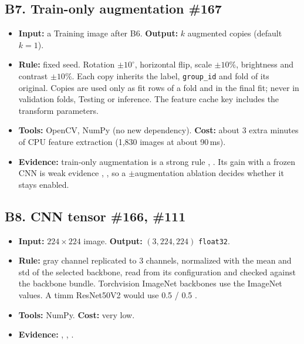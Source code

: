 \documentclass[11pt,a4paper]{article}
\newcommand{\board}[1]{\textsf{\##1}}
\begin{document}
\subsection*{B7. Train-only augmentation \hfill \board{167}}
\begin{itemize}
  \item \textbf{Input:} a Training image after B6. \textbf{Output:} $k$ augmented copies (default $k=1$).
  \item \textbf{Rule:} fixed seed. Rotation $\pm10^\circ$, horizontal flip, scale $\pm10\%$, brightness and contrast $\pm10\%$. Each copy inherits the label, \texttt{group\_id} and fold of its original. Copies are used only as fit rows of a fold and in the final fit; never in validation folds, Testing or inference. The feature cache key includes the transform parameters.
  \item \textbf{Tools:} OpenCV, NumPy (no new dependency). \textbf{Cost:} about 3 extra minutes of CPU feature extraction (1,830 images at about 90\,ms).
  \item \textbf{Evidence:} train-only augmentation is a strong rule \cite{r4}, \cite{r2}. Its gain with a frozen CNN is weak evidence \cite{r9}, \cite{r5}, so a $\pm$augmentation ablation decides whether it stays enabled.
\end{itemize}

\subsection*{B8. CNN tensor \hfill \board{166}, \board{111}}
\begin{itemize}
  \item \textbf{Input:} $224\times224$ image. \textbf{Output:} $(3, 224, 224)$ \texttt{float32}.
  \item \textbf{Rule:} gray channel replicated to 3 channels, normalized with the mean and std of the selected backbone, read from its configuration and checked against the backbone bundle. Torchvision ImageNet backbones use the ImageNet values. A timm ResNet50V2 would use 0.5 / 0.5 \cite{r11}.
  \item \textbf{Tools:} NumPy. \textbf{Cost:} very low.
  \item \textbf{Evidence:} \cite{r5}, \cite{r10}, \cite{r11}.
\end{itemize}
\end{document}

